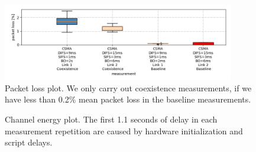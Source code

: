 \begin{figure}[tb]
	\label{fig:qa-packet-loss}
	\begin{center}
		\includegraphics[width=0.9\textwidth]{pictures/qa_packet_loss}
	\end{center}
	\caption[Quality norm packet loss plot.]{Packet loss plot. We only carry out coexistence measurements, if we have less than 0.2\% mean packet loss in the baseline measurements.}
\end{figure}

\begin{figure}[tb]
	\label{fig:qa-channel-energy}
	\begin{center}
	\end{center}
	\caption[Quality norm channel energy plot.]{Channel energy plot. The first 1.1 seconds of delay in each measurement repetition are caused by hardware initialization and script delays.}
\end{figure}


